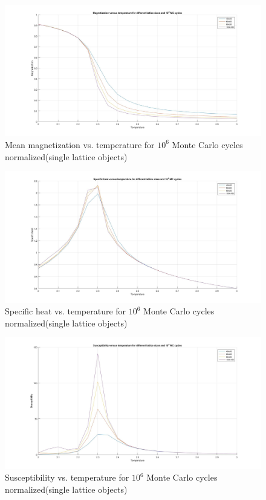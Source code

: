 \documentclass[10pt,a4paper]{article}
\begin{document}
\begin{figure}[H]
\centerline{
\includegraphics[scale=0.3]{magnetizationVSt}
}
\caption{Mean magnetization vs. temperature for $10^6$ Monte Carlo cycles normalized(single lattice objects)}
\label{fig:magnL}
\end{figure}

\begin{figure}[H]
\centerline{
\includegraphics[scale=0.3]{heatVSt}
}
\caption{Specific heat vs. temperature for $10^6$ Monte Carlo cycles normalized(single lattice objects)}
\label{fig:heatL}
\end{figure}

\begin{figure}[H]
\centerline{
\includegraphics[scale=0.3]{susceptibilityVSt}
}
\caption{Susceptibility vs. temperature for $10^6$ Monte Carlo cycles normalized(single lattice objects)}
\label{fig:susL}
\end{figure}
\end{document}
